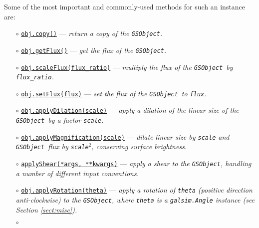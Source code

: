 \documentclass[preprint,11pt]{aastex}
\newcommand{\gsobject}{{\tt GSObject}}
\begin{document}
Some of the most important and commonly-used methods for such an
instance are:
\begin{itemize}
\item[$\circ$]
  \href{http://galsim-developers.github.com/GalSim/classgalsim_1_1base_1_1_g_s_object.html#aa0b398d4b0fca70211e4a73f81ea7e1a}{\texttt{obj.copy()}}
  --- \emph{return a copy of the \gsobject.}
\item[$\circ$]
  \href{http://galsim-developers.github.com/GalSim/classgalsim_1_1base_1_1_g_s_object.html#a662d8ce421ecd90080bdcaaf6890aed8}{\texttt{obj.getFlux()}}
  --- \emph{get the flux of the \gsobject.}
\item[$\circ$]\href{http://galsim-developers.github.com/GalSim/classgalsim_1_1base_1_1_g_s_object.html#af4193645a9af52e7d54a044cafec8ab9}{\texttt{obj.scaleFlux(flux\_ratio)}}
  --- \emph{multiply the flux of the \gsobject~by \texttt{flux\_ratio}.}
\item[$\circ$]
  \href{http://galsim-developers.github.com/GalSim/classgalsim_1_1base_1_1_g_s_object.html#a1993652591ddc802b734186391b28894}{\texttt{obj.setFlux(flux)}}
    --- \emph{set the flux of the \gsobject~to \texttt{flux}.}
\item[$\circ$]
  \href{http://galsim-developers.github.com/GalSim/classgalsim_1_1base_1_1_g_s_object.html#a4301c73bbc1491ebb170e64c509cadd5}{\texttt{obj.applyDilation(scale)}}
  --- \emph{apply a dilation of the linear size of the \gsobject~by a
  factor \texttt{scale}.}
\item[$\circ$]
  \href{http://galsim-developers.github.com/GalSim/classgalsim_1_1base_1_1_g_s_object.html#a9d13b0238057f6d5d01f2681d91c09b0}{\texttt{obj.applyMagnification(scale)}}
  --- \emph{dilate linear size by \texttt{scale} and \gsobject~flux by
  \texttt{scale}$^2$, conserving surface brightness.}
\item[$\circ$]
  \href{http://galsim-developers.github.com/GalSim/classgalsim_1_1base_1_1_g_s_object.html#a85cc0094dcf470cfbff93d9830ab80bd}{\texttt{applyShear(*args,
      **kwargs)}}
  --- \emph{apply a shear to the \gsobject, handling a number of different
  input conventions.}
\item[$\circ$]
  \href{http://galsim-developers.github.com/GalSim/classgalsim_1_1base_1_1_g_s_object.html#ad6236e3153f23f1201396369dd67f1c7}{\texttt{obj.applyRotation(theta)}}
  --- \emph{apply a rotation of \texttt{theta} (positive direction
  anti-clockwise) to the \gsobject, where \texttt{theta} is a
  \texttt{galsim.Angle} instance (see Section \ref{sect:misc}). }
\item[$\circ$]

\end{itemize}
\end{document}
